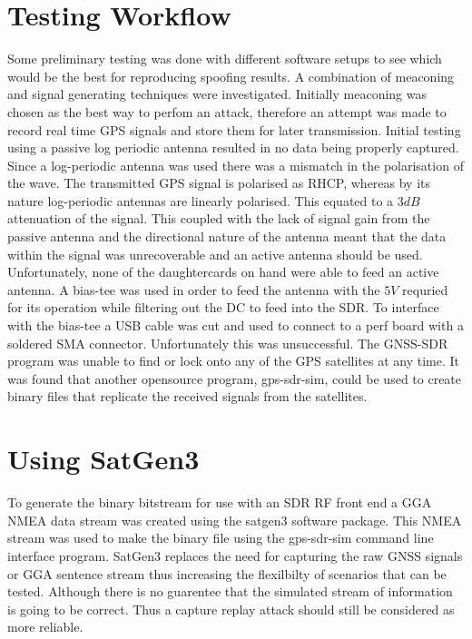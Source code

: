 \section{Testing Workflow}

Some preliminary testing was done with different software setups to see which would be the best for reproducing spoofing results. A combination of meaconing and signal
generating techniques were investigated. Initially meaconing was chosen as the best way to perfom an attack, therefore an attempt was made to record real time GPS signals
and store them for later transmission. Initial testing using a passive log periodic antenna resulted in no data being properly captured. Since a log-periodic antenna was
used there was a mismatch in the polarisation of the wave. The transmitted GPS signal is polarised as RHCP, whereas by its nature log-periodic antennas are linearly
polarised. This equated to a $3dB$ attenuation of the signal. This coupled with the lack of signal gain from the passive antenna and the directional nature of the antenna
meant that the data within the signal was unrecoverable and an active antenna should be used. Unfortunately, none of the daughtercards on hand were able to feed an active
antenna. A bias-tee was used in order to feed the antenna with the $5V$ requried for its operation while filtering out the DC to feed into the SDR. To interface with the
bias-tee a USB cable was cut and used to connect to a perf board with a soldered SMA connector. Unfortunately this was unsuccessful. The GNSS-SDR program was unable to
find or lock onto any of the GPS satellites at any time. It was found that another opensource program, gps-sdr-sim, could be used to create binary files that replicate
the received signals from the satellites. 

\section{Using SatGen3}

To generate the binary bitstream for use with an SDR RF front end a GGA NMEA data stream was created using the satgen3 software package. This NMEA stream was used to make
the binary file using the gps-sdr-sim command line interface program. SatGen3 replaces the need for capturing the raw GNSS signals or GGA sentence stream thus increasing
the flexilbilty of scenarios that can be tested. Although there is no guarentee that the simulated stream of information is going to be correct. Thus a capture replay
attack should still be considered as more reliable.

